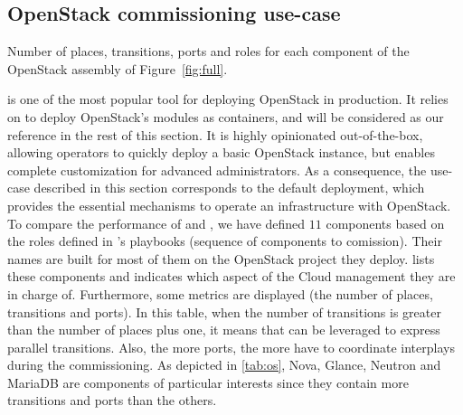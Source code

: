 \subsection{OpenStack commissioning use-case}

\begin{table}
  \begin{center}
    
    \caption{Number of places, transitions, ports and roles for each \mad component
        of the OpenStack assembly of Figure~\ref{fig:full}.}
    \label{tab:os}
  \end{center}
\end{table}


\kolla is one of the most popular tool for deploying OpenStack in
production.  It relies on \ansible to deploy OpenStack's modules as
\docker containers, and will be considered as our reference in the
rest of this section. It is highly opinionated out-of-the-box,
allowing operators to quickly deploy a basic OpenStack instance, but
enables complete customization for advanced administrators. As a
consequence, the use-case described in this section corresponds to the
default \kolla deployment, which provides the essential mechanisms to
operate an infrastructure with OpenStack.
%
To compare the performance of \kolla and \mad, we have defined $11$
\mad components based on the \ansible roles defined in \kolla's
playbooks (\ie \ansible sequence of components to comission). Their
names are built for most of them on the OpenStack project they deploy.
 lists these components and indicates which aspect of the
Cloud management they are in charge of. Furthermore, some \mad metrics
are displayed (\ie the number of places, transitions and ports).
%
In this table, when the number of transitions is greater than the
number of places plus one, it means that \mad can be leveraged to
express parallel transitions. Also, the more ports, the more \mad have
to coordinate interplays during the commissioning. As depicted in
\cref{tab:os}, Nova, Glance, Neutron and MariaDB are components of
particular interests since they contain more transitions and ports
than the others.

